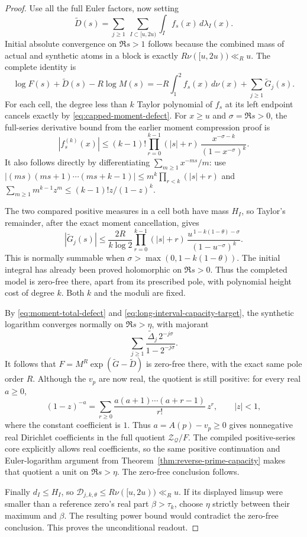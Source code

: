 \documentclass[11pt]{article}
\theoremstyle{definition}
\begin{document}
\begin{proof}
Use all the full Euler factors, now setting
\[
 \widetilde D(s)=\sum_{j\ge1}\ \sum_{I\subset[u,2u)}
                           \int_I f_s(x)\,d\lambda_I(x).
\]
Initial absolute convergence on $\Re s>1$ follows because
the combined mass of actual and synthetic atoms in a block
is exactly $R\nu([u,2u))\ll_Ru$.
The complete identity is
\[
 \log F(s)+\widetilde D(s)-R\log M(s)
       =-R\int_1^2 f_s(x)\,d\nu(x)+\sum_{j\ge1}\widetilde G_j(s).
\]
For each cell, the degree less than $k$ Taylor polynomial of
$f_s$ at its left endpoint cancels exactly by
\eqref{eq:capped-moment-defect}.
For $x\ge u$ and $\sigma=\Re s>0$, the full-series derivative
bound from the earlier moment compression proof is
\[
 |f_s^{(k)}(x)|\le
 (k-1)!\prod_{r=0}^{k-1}(|s|+r)\,
       \frac{x^{-\sigma-k}}{(1-x^{-\sigma})^k}.
\]
It also follows directly by differentiating
$\sum_{m\ge1}x^{-ms}/m$: use
$|(ms)(ms+1)\cdots(ms+k-1)|
 \le m^k\prod_{r<k}(|s|+r)$ and
$\sum_{m\ge1}m^{k-1}z^m\le(k-1)!z/(1-z)^k$.

The two compared positive measures in a cell both have mass
$H_I$, so Taylor's remainder, after the exact moment cancellation,
gives
\begin{equation}
 |\widetilde G_j(s)|\le
 \frac{2R}{k\log2}\prod_{r=0}^{k-1}(|s|+r)\,
 \frac{u^{\,1-k(1-\theta)-\sigma}}{(1-u^{-\sigma})^k}.
 \label{eq:capped-high-moment-error}
\end{equation}
This is normally summable when
$\sigma>\max(0,1-k(1-\theta))$.
The initial integral has already been proved holomorphic
on $\Re s>0$. Thus the completed model is zero-free there,
apart from its prescribed pole, with polynomial height
cost of degree $k$. Both $k$ and the moduli are fixed.

By \eqref{eq:moment-total-defect} and
\eqref{eq:long-interval-capacity-target}, the synthetic
logarithm converges normally on $\Re s>\eta$, with majorant
\[
 \sum_{j\ge1}\frac{\widetilde\Delta_j\,2^{-j\sigma}}
                           {1-2^{-j\sigma}}.
\]
It follows that $F=M^R\exp(\widetilde G-\widetilde D)$
is zero-free there, with the exact same pole order $R$.
Although the $v_p$ are now real, the quotient is still positive:
for every real $a\ge0$,
\[
 (1-z)^{-a}=\sum_{r\ge0}
      \frac{a(a+1)\cdots(a+r-1)}{r!}\,z^r,\qquad |z|<1,
\]
where the constant coefficient is $1$.
Thus $a=A(p)-v_p\ge0$ gives nonnegative real Dirichlet
coefficients in the full quotient
$\mathcal Z_{\mathcal Q}/F$.
The compiled positive-series core explicitly allows real
coefficients, so the same positive continuation and
Euler-logarithm argument from
Theorem~\ref{thm:reverse-prime-capacity} makes that quotient a unit
on $\Re s>\eta$. The zero-free conclusion follows.

Finally $d_I\le H_I$, so
$\mathcal D_{j,k,\theta}\le R\nu([u,2u))\ll_Ru$.
If its displayed limsup were smaller than a reference
zero's real part $\beta>\tau_k$, choose $\eta$ strictly between
their maximum and $\beta$. The resulting power bound would
contradict the zero-free conclusion. This proves the
unconditional readout.
\end{proof}
\end{document}
